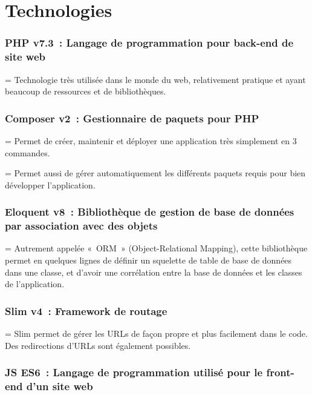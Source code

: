 \chapter{Technologies}

\subsection*{PHP v7.3~: Langage de programmation pour back-end de site web}

\hangindent=\parindent%
Technologie très utilisée dans le monde du web, relativement pratique et ayant beaucoup de ressources et de bibliothèques.
          
\subsection*{Composer v2~: Gestionnaire de paquets pour PHP}
    
\hangindent=\parindent%
Permet de créer, maintenir et déployer une application très simplement en 3 commandes.

\hangindent=\parindent%
Permet aussi de gérer automatiquement les différents paquets requis pour bien développer l'application.

\subsection*{Eloquent v8~: Bibliothèque de gestion de base de données par association avec des objets}
    
\hangindent=\parindent%
Autrement appelée «~ORM~» (Object-Relational Mapping), cette bibliothèque permet en quelques lignes de définir un squelette de table de base de données dans une classe, et d'avoir une corrélation entre la base de données et les classes de l'application.
          
\subsection*{Slim v4~: Framework de routage}
        
\hangindent=\parindent%
Slim permet de gérer les URLs de façon propre et  plus facilement dans le code. Des redirections d'URLs sont également possibles.

\subsection*{JS ES6~: Langage de programmation utilisé pour le front-end d'un site web}
    
